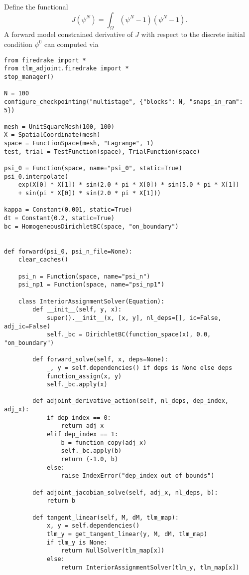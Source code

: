 \documentclass[11pt]{article}
\begin{document}
Define the functional
\begin{equation*}
  J \left( \psi^N \right) = \int_\Omega \left( \psi^N - 1 \right) \left( \psi^N - 1 \right).
\end{equation*}
A forward model constrained derivative of $J$ with respect to the discrete
initial condition $\psi^0$ can computed via
\begin{lstlisting}
from firedrake import *
from tlm_adjoint.firedrake import *
stop_manager()

N = 100
configure_checkpointing("multistage", {"blocks": N, "snaps_in_ram": 5})

mesh = UnitSquareMesh(100, 100)
X = SpatialCoordinate(mesh)
space = FunctionSpace(mesh, "Lagrange", 1)
test, trial = TestFunction(space), TrialFunction(space)

psi_0 = Function(space, name="psi_0", static=True)
psi_0.interpolate(
    exp(X[0] * X[1]) * sin(2.0 * pi * X[0]) * sin(5.0 * pi * X[1])
    + sin(pi * X[0]) * sin(2.0 * pi * X[1]))

kappa = Constant(0.001, static=True)
dt = Constant(0.2, static=True)
bc = HomogeneousDirichletBC(space, "on_boundary")


def forward(psi_0, psi_n_file=None):
    clear_caches()

    psi_n = Function(space, name="psi_n")
    psi_np1 = Function(space, name="psi_np1")

    class InteriorAssignmentSolver(Equation):
        def __init__(self, y, x):
            super().__init__(x, [x, y], nl_deps=[], ic=False, adj_ic=False)
            self._bc = DirichletBC(function_space(x), 0.0, "on_boundary")

        def forward_solve(self, x, deps=None):
            _, y = self.dependencies() if deps is None else deps
            function_assign(x, y)
            self._bc.apply(x)

        def adjoint_derivative_action(self, nl_deps, dep_index, adj_x):
            if dep_index == 0:
                return adj_x
            elif dep_index == 1:
                b = function_copy(adj_x)
                self._bc.apply(b)
                return (-1.0, b)
            else:
                raise IndexError("dep_index out of bounds")

        def adjoint_jacobian_solve(self, adj_x, nl_deps, b):
            return b

        def tangent_linear(self, M, dM, tlm_map):
            x, y = self.dependencies()
            tlm_y = get_tangent_linear(y, M, dM, tlm_map)
            if tlm_y is None:
                return NullSolver(tlm_map[x])
            else:
                return InteriorAssignmentSolver(tlm_y, tlm_map[x])


\end{lstlisting}
\end{document}
